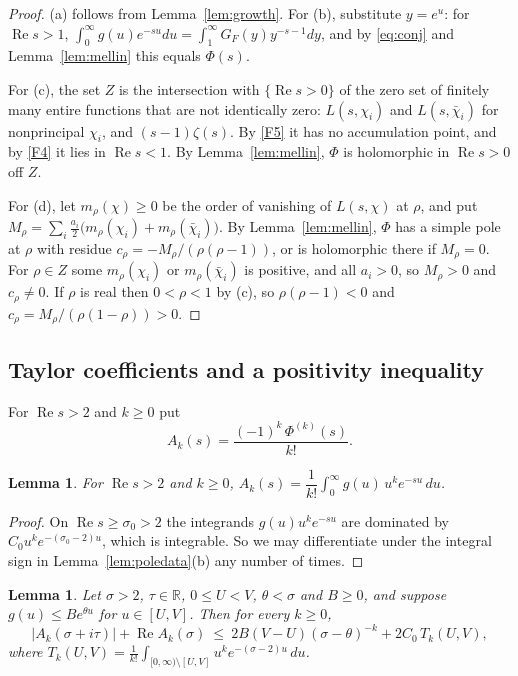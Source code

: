 \documentclass[11pt]{amsart}
\newcommand{\R}{\mathbb{R}}
\newcommand{\re}{\operatorname{Re}}
\theoremstyle{plain}
\newtheorem{lemma}[theorem]{Lemma}
\theoremstyle{definition}
\numberwithin{equation}{section}
\begin{document}
\begin{proof}
(a) follows from Lemma~\ref{lem:growth}. For (b), substitute $y=e^u$: for $\re s>1$,
$\int_0^\infty g(u)e^{-su}du=\int_1^\infty G_F(y)y^{-s-1}dy$, and by \eqref{eq:conj} and
Lemma~\ref{lem:mellin} this equals $\Phi(s)$.

For (c), the set $Z$ is the intersection with $\{\re s>0\}$ of the zero set of finitely many
entire functions that are not identically zero: $L(s,\chi_i)$ and $L(s,\bar\chi_i)$ for
nonprincipal $\chi_i$, and $(s-1)\zeta(s)$. By \ref{F5} it has no accumulation point, and by
\ref{F4} it lies in $\re s<1$. By Lemma~\ref{lem:mellin}, $\Phi$ is holomorphic in $\re s>0$ off $Z$.

For (d), let $m_\rho(\chi)\ge0$ be the order of vanishing of $L(s,\chi)$ at $\rho$, and put
$M_\rho=\sum_i\frac{a_i}{2}\bigl(m_\rho(\chi_i)+m_\rho(\bar\chi_i)\bigr)$. By
Lemma~\ref{lem:mellin}, $\Phi$ has a simple pole at $\rho$ with residue
$c_\rho=-M_\rho/(\rho(\rho-1))$, or is holomorphic there if $M_\rho=0$. For $\rho\in Z$ some
$m_\rho(\chi_i)$ or $m_\rho(\bar\chi_i)$ is positive, and all $a_i>0$, so $M_\rho>0$ and $c_\rho\neq0$.
If $\rho$ is real then $0<\rho<1$ by (c), so $\rho(\rho-1)<0$ and $c_\rho=M_\rho/(\rho(1-\rho))>0$.
\end{proof}

\subsection{Taylor coefficients and a positivity inequality}

For $\re s>2$ and $k\ge0$ put
\[
A_k(s)=\frac{(-1)^k\,\Phi^{(k)}(s)}{k!}.
\]

\begin{lemma}\label{lem:taylor}
For $\re s>2$ and $k\ge0$, $A_k(s)=\dfrac1{k!}\displaystyle\int_0^\infty g(u)\,u^k e^{-su}\,du$.
\end{lemma}

\begin{proof}
On $\re s\ge\sigma_0>2$ the integrands $g(u)u^ke^{-su}$ are dominated by $C_0u^ke^{-(\sigma_0-2)u}$,
which is integrable. So we may differentiate under the integral sign in Lemma~\ref{lem:poledata}(b)
any number of times.
\end{proof}

\begin{lemma}\label{lem:positivity}
Let $\sigma>2$, $\tau\in\R$, $0\le U<V$, $\theta<\sigma$ and $B\ge0$, and suppose $g(u)\le Be^{\theta u}$
for $u\in[U,V]$. Then for every $k\ge0$,
\[
\bigl|A_k(\sigma+i\tau)\bigr|+\re A_k(\sigma)\ \le\ 2B(V-U)(\sigma-\theta)^{-k}+2C_0\,T_k(U,V),
\]
where $T_k(U,V)=\frac1{k!}\int_{[0,\infty)\setminus[U,V]}u^ke^{-(\sigma-2)u}\,du$.
\end{lemma}
\end{document}
